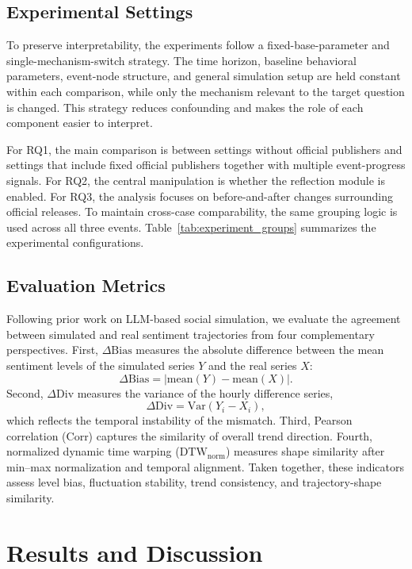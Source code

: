 \documentclass[11pt]{article}
\begin{document}
\subsection{Experimental Settings}
To preserve interpretability, the experiments follow a fixed-base-parameter and single-mechanism-switch strategy. The time horizon, baseline behavioral parameters, event-node structure, and general simulation setup are held constant within each comparison, while only the mechanism relevant to the target question is changed. This strategy reduces confounding and makes the role of each component easier to interpret.

For RQ1, the main comparison is between settings without official publishers and settings that include fixed official publishers together with multiple event-progress signals. For RQ2, the central manipulation is whether the reflection module is enabled. For RQ3, the analysis focuses on before-and-after changes surrounding official releases. To maintain cross-case comparability, the same grouping logic is used across all three events. Table~\ref{tab:experiment_groups} summarizes the experimental configurations.



\subsection{Evaluation Metrics}
Following prior work on LLM-based social simulation, we evaluate the agreement between simulated and real sentiment trajectories from four complementary perspectives. First, $\Delta\mathrm{Bias}$ measures the absolute difference between the mean sentiment levels of the simulated series $Y$ and the real series $X$:
\[
\Delta\mathrm{Bias} = |\mathrm{mean}(Y) - \mathrm{mean}(X)|.
\]
Second, $\Delta\mathrm{Div}$ measures the variance of the hourly difference series,
\[
\Delta\mathrm{Div} = \mathrm{Var}(Y_i - X_i),
\]
which reflects the temporal instability of the mismatch. Third, Pearson correlation (Corr) captures the similarity of overall trend direction. Fourth, normalized dynamic time warping ($\mathrm{DTW}_{\mathrm{norm}}$) measures shape similarity after min--max normalization and temporal alignment. Taken together, these indicators assess level bias, fluctuation stability, trend consistency, and trajectory-shape similarity.

\section{Results and Discussion}
\end{document}
